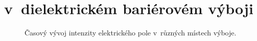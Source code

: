 \chapter[\EFISH]{{\EFISH} v~dielektrickém bariérovém výboji}

\begin{figure}
	
\end{figure}

\begin{figure}
	
	\caption{Časový vývoj intenzity elektrického pole
		v~různých místech výboje.}
\end{figure}
